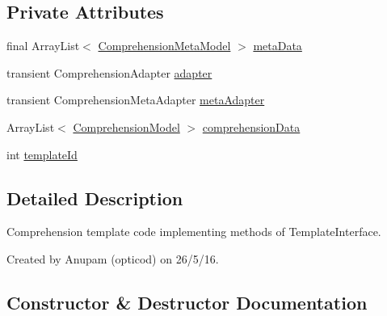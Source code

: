 \subsection*{Private Attributes}
\begin{DoxyCompactItemize}
\item 
final Array\+List$<$ \hyperlink{classorg_1_1buildmlearn_1_1toolkit_1_1templates_1_1ComprehensionMetaModel}{Comprehension\+Meta\+Model} $>$ \hyperlink{classorg_1_1buildmlearn_1_1toolkit_1_1templates_1_1ComprehensionTemplate_ad458702d05c5ebc9cce614fbc86a8574}{meta\+Data}
\item 
transient Comprehension\+Adapter \hyperlink{classorg_1_1buildmlearn_1_1toolkit_1_1templates_1_1ComprehensionTemplate_aa37619ff1e1746715e161213fc61e4a9}{adapter}
\item 
transient Comprehension\+Meta\+Adapter \hyperlink{classorg_1_1buildmlearn_1_1toolkit_1_1templates_1_1ComprehensionTemplate_af82a9b66a1d74ef4c0e00749da7be452}{meta\+Adapter}
\item 
Array\+List$<$ \hyperlink{classorg_1_1buildmlearn_1_1toolkit_1_1templates_1_1ComprehensionModel}{Comprehension\+Model} $>$ \hyperlink{classorg_1_1buildmlearn_1_1toolkit_1_1templates_1_1ComprehensionTemplate_a690317809307900381bf4d1d26da3115}{comprehension\+Data}
\item 
int \hyperlink{classorg_1_1buildmlearn_1_1toolkit_1_1templates_1_1ComprehensionTemplate_ae08ea9d3e4cade37472f3521c239c1f7}{template\+Id}
\end{DoxyCompactItemize}


\subsection{Detailed Description}
Comprehension template code implementing methods of Template\+Interface. 

Created by Anupam (opticod) on 26/5/16. 

\subsection{Constructor \& Destructor Documentation}
